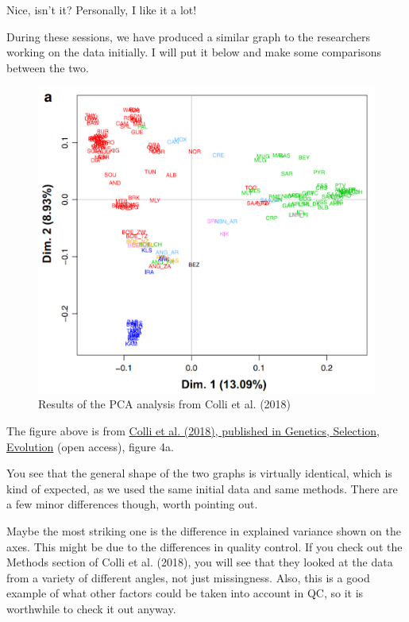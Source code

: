 \documentclass[]{book}
\begin{document}
Nice, isn't it? Personally, I like it a lot!

During these sessions, we have produced a similar graph to the
researchers working on the data initially. I will put it below and make
some comparisons between the two.

\begin{figure}
\includegraphics[width=7.17in]{images/9-2-resultsPcaPaper} \caption{Results of the PCA analysis from Colli et al. (2018)}\label{fig:fig9-2}
\end{figure}

The figure above is from
\href{https://gsejournal.biomedcentral.com/track/pdf/10.1186/s12711-018-0422-x}{Colli
et al. (2018), published in Genetics, Selection, Evolution} (open
access), figure 4a.

You see that the general shape of the two graphs is virtually identical,
which is kind of expected, as we used the same initial data and same
methods. There are a few minor differences though, worth pointing out.

Maybe the most striking one is the difference in explained variance
shown on the axes. This might be due to the differences in quality
control. If you check out the Methods section of Colli et al. (2018),
you will see that they looked at the data from a variety of different
angles, not just missingness. Also, this is a good example of what other
factors could be taken into account in QC, so it is worthwhile to check
it out anyway.
\end{document}
